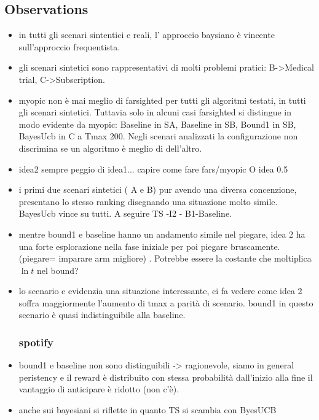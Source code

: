 \subsection{Observations}
\begin{itemize}
	
	\item in tutti gli scenari sintentici e reali, l' approccio baysiano è vincente sull'approccio frequentista.
	
	\item gli scenari sintetici sono rappresentativi di molti problemi pratici: B->Medical trial, C->Subscription.
	
	\item myopic non è mai meglio di farsighted per tutti gli algoritmi testati, in tutti gli scenari sintetici. Tuttavia solo in alcuni casi farsighted si distingue in modo evidente da myopic: Baseline in SA, Baseline in SB, Bound1 in SB, BayesUcb in C a Tmax 200. Negli scenari analizzati la configurazione non discrimina se un algoritmo è meglio di dell'altro.
	
	\item idea2 sempre peggio di idea1... capire come fare fars/myopic O idea 0.5
	
	
	\item i primi due scenari sintetici ( A e B) pur avendo una diversa concenzione, presentano lo stesso ranking disegnando una situazione molto simile. BayesUcb vince su tutti. A seguire TS -I2 - B1-Baseline.
	
	\item mentre bound1 e baseline hanno un andamento simile nel piegare, idea 2 ha una forte esplorazione nella fase iniziale per poi piegare bruscamente. (piegare= imparare arm migliore) . Potrebbe essere la costante che moltiplica $\ln t$ nel bound?
	
	\item lo scenario c evidenzia una situazione interessante, ci fa vedere come idea 2 soffra maggiormente l'aumento di tmax a parità di scenario. bound1 in questo scenario è quasi indistinguibile alla baseline.
	
	\subsubsection{spotify}
	
	\item bound1 e baseline non sono distinguibili -> ragionevole, siamo in general peristency e il reward è distribuito con stessa probabilità dall'inizio alla fine il vantaggio di anticipare è ridotto (non c'è).
	\item anche sui bayesiani si riflette in quanto TS si scambia con ByesUCB
	

\end{itemize}
